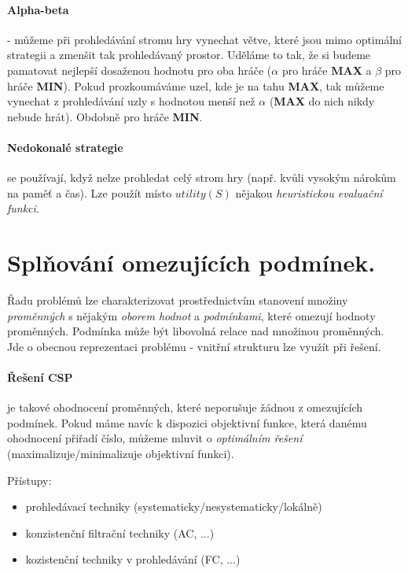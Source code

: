\documentclass[a4paper]{article}      %
\begin{document}
\paragraph{Alpha-beta} - můžeme při prohledávání stromu hry vynechat větve,
které jsou mimo optimální strategii a zmenšit tak prohledávaný prostor.
Uděláme to tak, že si budeme pamatovat nejlepší dosaženou hodnotu pro oba hráče ($\alpha$ pro hráče \textbf{MAX} a $\beta$ pro hráče \textbf{MIN}). Pokud prozkoumáváme uzel, kde je na tahu \textbf{MAX}, tak můžeme vynechat z prohledávání uzly s hodnotou menší než $\alpha$ (\textbf{MAX} do nich nikdy nebude hrát). Obdobně pro hráče \textbf{MIN}.

\paragraph{Nedokonalé strategie} se používají, když nelze prohledat celý strom hry (např. kvůli vysokým nárokům na paměť a čas).
Lze použít místo $utility(S)$ nějakou \emph{heuristickou evaluační funkci}.

\section{Splňování omezujících podmínek.}
Řadu problémů lze charakterizovat prostřednictvím stanovení množiny \emph{proměnných} s nějakým \emph{oborem hodnot} a \emph{podmínkami}, které
omezují hodnoty proměnných. Podmínka může být libovolná relace nad množinou proměnných.
Jde o obecnou reprezentaci problému - vnitřní strukturu lze využít při řešení.\\

\paragraph{Řešení CSP} je takové ohodnocení proměnných, které neporušuje žádnou z omezujících podmínek.
Pokud máme navíc k dispozici objektivní funkce, která danému ohodnocení přiřadí číslo, můžeme mluvit o \emph{optimálním řešení} (maximalizuje/minimalizuje objektivní funkci).

Přístupy:
\begin{itemize}
\item prohledávací techniky (systematicky/nesystematicky/lokálně)
\item konzistenční filtrační techniky (AC, ...)
\item kozistenční techniky v prohledávání (FC, ...)
\end{itemize}
\end{document}
